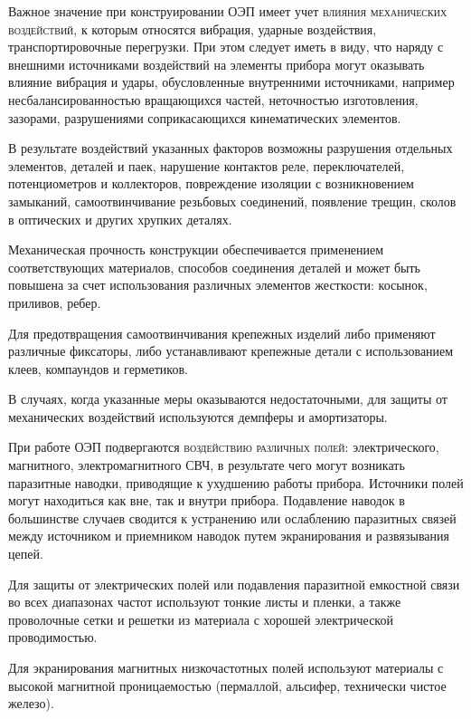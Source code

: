 Важное значение при конструировании ОЭП имеет учет \textsc{влияния механических воздействий}, к которым относятся вибрация, ударные воздействия, транспортировочные перегрузки. При этом следует иметь в виду, что наряду с внешними источниками воздействий на элементы прибора могут оказывать влияние вибрация и удары, обусловленные внутренними источниками, например несбалансированностью вращающихся частей, неточностью изготовления, зазорами, разрушениями соприкасающихся кинематических элементов.

В результате воздействий указанных факторов возможны разрушения отдельных элементов, деталей и паек, нарушение контактов реле, переключателей, потенциометров и коллекторов, повреждение изоляции с возникновением замыканий, самоотвинчивание резьбовых соединений, появление трещин, сколов в оптических и других хрупких деталях.

Механическая прочность конструкции обеспечивается применением соответствующих материалов, способов соединения деталей и может быть повышена за счет использования различных элементов жесткости: косынок, приливов, ребер.

Для предотвращения самоотвинчивания крепежных изделий либо применяют различные фиксаторы, либо устанавливают крепежные детали с использованием клеев, компаундов и герметиков. 

В случаях, когда указанные меры оказываются недостаточными, для защиты от механических воздействий используются демпферы и амортизаторы.

При работе ОЭП подвергаются \textsc{воздействию различных полей}: электрического, магнитного, электромагнитного СВЧ, в результате чего могут возникать паразитные наводки, приводящие к ухудшению работы прибора. Источники полей могут находиться как вне, так и внутри прибора. Подавление наводок в большинстве случаев сводится к устранению или ослаблению паразитных связей между источником и приемником наводок путем экранирования и развязывания цепей.

Для защиты от электрических полей или подавления паразитной емкостной связи во всех диапазонах частот используют тонкие листы и пленки, а также проволочные сетки и решетки из материала с хорошей электрической проводимостью.

Для экранирования магнитных низкочастотных полей используют материалы с высокой магнитной проницаемостью (пермаллой, альсифер, технически чистое железо).

